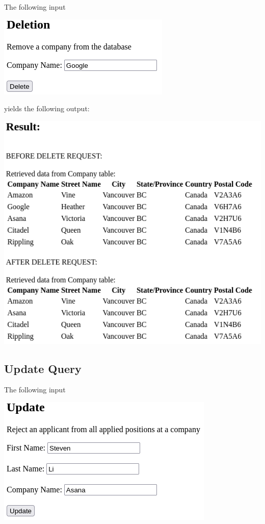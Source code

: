 The following input

\includegraphics[width=0.5\linewidth]{src/6/2022-03-30-174249_310x147_scrot.png}

yields the following output:

\includegraphics[width=\linewidth]{src/6/2022-03-30-174258_548x475_scrot.png}

\newpage

\subsection{Update Query}

The following input

\includegraphics[width=0.5\linewidth]{src/6/2022-03-30-174510_392x231_scrot.png}

